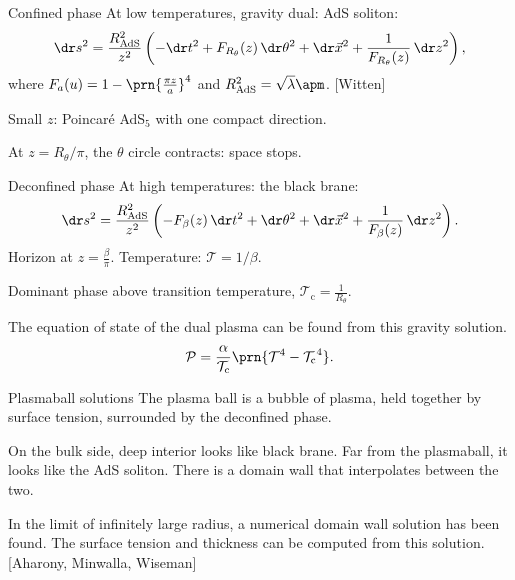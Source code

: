 \documentclass{beamer}
\newcommand{\rref}[1]{\hfill \small{\color{darkgrey} [#1]}}
\newcommand{\tc}{\mathcal{T_\mathrm{c}}}
\newcommand{\eos}{\alpha}
\newcommand{\tloc}{\mathcal{T}}
\newcommand{\ploc}{\mathcal{P}}
\newcommand{\rads}{R_\text{AdS}}
\begin{document}

\begin{frame}{Confined phase}
%
 At low temperatures, gravity dual: \alert{AdS soliton}:
 \begin{equation*}\label{deconfmet:eq}
  \dr s^2 = \frac{\rads^2}{z^2}\left(
       -\dr t^2 + F_{R_\theta}(z)\, \dr\theta^2 + \dr \vec{x}^2
       + \frac{1}{F_{R_\theta}(z)}\, \dr z^2 \right),
 \end{equation*}
 where $ F_{a}(u) = 1 - \prn{ \frac{\pi  z}{a} }^{4}$ and $\rads^2=\sqrt{\lambda}\apm$. \rref{Witten}

 \vp Small $z$: Poincar\'e AdS$_5$ with one compact direction.

 \vp At $z=R_{\theta}/\pi$, the $\theta$ circle contracts: space stops.
 \begin{center}
   
 \end{center}
%
\end{frame}


\begin{frame}{Deconfined phase}
%
 At high temperatures: \alert{the black brane}:
 \begin{equation*}
  \dr s^2 = \frac{\rads^2}{z^2}  \left(
     -F_{\beta}(z)\, \dr t^2 + \dr\theta^2 + \dr \vec{x}^2
     + \frac{1}{F_{\beta}(z)}\, \dr z^2 \right) .
 \end{equation*}
 Horizon at $z=\frac{\beta}{\pi}$. Temperature: $\tloc=1/\beta$.

 \vp Dominant phase above transition temperature,  $\tc=\frac{1}{R_\theta}$.

 \vp The equation of state of the dual plasma can be found from this gravity solution.
 \begin{equation*}
   \ploc = \frac{\eos}{\tc} \prn{\tloc^4-\tc^4}.
 \end{equation*}
%
\end{frame}


\begin{frame}{Plasmaball solutions}
%
 The plasma ball is a bubble of plasma, held together by surface tension, surrounded by the deconfined phase.

 \vp On the bulk side, deep interior looks like black brane. Far from the plasmaball, it looks like the AdS soliton. There is a domain wall that interpolates between the two.
 \begin{center}
   
 \end{center}
 In the limit of infinitely large radius, a numerical domain wall solution has been found. The surface tension and thickness can be computed from this solution. \rref{Aharony, Minwalla, Wiseman}
%
\end{frame}
\end{document}

